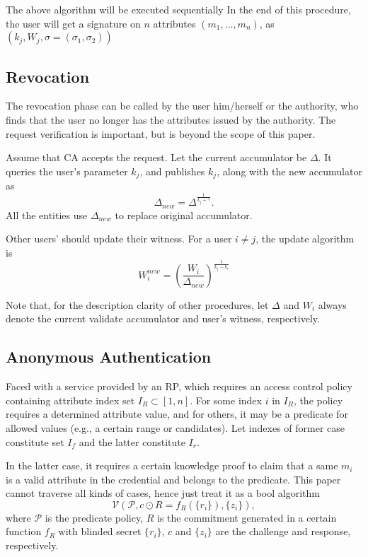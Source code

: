 \documentclass[journal]{IEEEtran}
\begin{document}
The above algorithm will be executed sequentially In the end of this procedure, the user will get a signature on $n$ attributes $(m_1,\dots, m_n)$, as $(k_j, W_j, \sigma=(\sigma_1, \sigma_2))$

\subsection{Revocation}
The revocation phase can be called by the user him/herself or the authority, who finds that the user no longer has the attributes issued by the authority. The request verification is important, but is beyond the scope of this paper. 

Assume that CA accepts the request. Let the current accumulator be $\Delta$. It queries the user's parameter $k_j$, and publishes $k_j$, along with the new accumulator as $$\Delta_{new} = \Delta^{\frac{1}{k_j + \gamma}}.$$ All the entities use $\Delta_{new}$ to replace original accumulator. 

Other users' should update their witness. For a user $i\neq j$, the update algorithm is 
$$W_i^{new} = (\frac{W_i}{\Delta_{new}})^{\frac{1}{k_j-k_i}}$$

Note that, for the description clarity of other procedures, let $\Delta$ and $W_i$ always denote the current validate accumulator and user's witness, respectively. 
	
	
\subsection{Anonymous Authentication}
Faced with a service provided by an RP, which requires an access control policy containing attribute index set $I_R\subset [1, n]$. For some index $i$ in $I_R$, the policy requires a determined attribute value, and for others, it may be a predicate for allowed values (e.g., a certain range or candidates).  Let indexes of former case constitute set $I_f$ and the latter constitute $I_r$. 

In the latter case, it requires a certain knowledge proof to claim that a same $m_i$ is a valid attribute in the credential and belongs to the predicate. This paper cannot traverse all kinds of cases, hence just treat it as a bool algorithm 
$$\mathcal{V}(\mathcal{P}, c\odot R=f_R(\{r_i\}), \{z_i\}),$$
where $\mathcal{P}$ is the predicate policy, $R$ is the commitment generated in a certain function $f_R$ with blinded secret $\{r_i\}$, $c$ and $\{z_i\}$ are the challenge and response, respectively.
\end{document}

